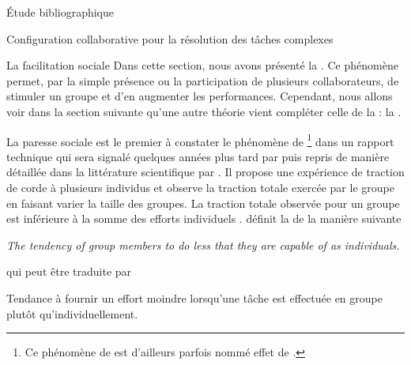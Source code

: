 \documentclass[myfrancais,ngerman,english,french]{mythesis}
\begin{document}
\begin{mychapter}{Étude bibliographique}
\begin{mysection}{Configuration collaborative pour la résolution des tâches complexes}
\begin{mysubsection}{La facilitation sociale}
				Dans cette section, nous avons présenté la .
				Ce phénomène permet, par la simple présence ou la participation de plusieurs collaborateurs, de stimuler un groupe et d'en augmenter les performances.
				Cependant, nous allons voir dans la section suivante qu'une autre théorie vient compléter celle de la  : la .
			\end{mysubsection}
			\begin{mysubsection}{La paresse sociale}
				 est le premier à constater le phénomène de \footnote{Ce phénomène de  est d'ailleurs parfois nommé \og effet de  \fg.} dans un rapport technique qui sera signalé quelques années plus tard par  puis repris de manière détaillée dans la littérature scientifique par .
				Il propose une expérience de traction de corde à plusieurs individus et observe la traction totale exercée par le groupe en faisant varier la taille des groupes.
				La traction totale observée pour un groupe est inférieure à la somme des efforts individuels .
				 définit la  de la manière suivante
				\begin{myquote}[english]
					\it The tendency of group members to do less that they are capable of as individuals.
				\end{myquote}
				qui peut être traduite par
				\begin{myquote}[french]
					Tendance à fournir un effort moindre lorsqu'une tâche est effectuée en groupe plutôt qu'individuellement.
				\end{myquote}


\end{mysubsection}
\end{mysection}
\end{mychapter}
\end{document}

